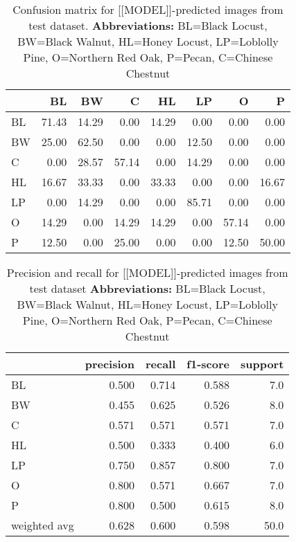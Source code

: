 \documentclass[10pt,twocolumn,letterpaper]{article}
\begin{document}
\begin{table}[!htbp]
  \begin{center}
    \small
    \begin{tabular}{lrrrrrrr}
      \toprule
      {} &     BL &     BW &      C &     HL &     LP &      O &      P \\
      \midrule
      BL &  71.43 &  14.29 &   0.00 &  14.29 &   0.00 &   0.00 &   0.00 \\
      BW &  25.00 &  62.50 &   0.00 &   0.00 &  12.50 &   0.00 &   0.00 \\
      C  &   0.00 &  28.57 &  57.14 &   0.00 &  14.29 &   0.00 &   0.00 \\
      HL &  16.67 &  33.33 &   0.00 &  33.33 &   0.00 &   0.00 &  16.67 \\
      LP &   0.00 &  14.29 &   0.00 &   0.00 &  85.71 &   0.00 &   0.00 \\
      O  &  14.29 &   0.00 &  14.29 &  14.29 &   0.00 &  57.14 &   0.00 \\
      P  &  12.50 &   0.00 &  25.00 &   0.00 &   0.00 &  12.50 &  50.00 \\
      \bottomrule
      \end{tabular}
  \end{center}
  \caption{\label{tab:confusion} Confusion matrix for [[MODEL]]-predicted images from test dataset. \textbf{Abbreviations:} BL=Black Locust, BW=Black Walnut, HL=Honey Locust, LP=Loblolly Pine, O=Northern Red Oak, P=Pecan, C=Chinese Chestnut}
  \end{table}


  \begin{table}[!htbp]
    \begin{center}
      \small
      \begin{tabular}{lrrrr}
        \toprule
        {} &  precision &  recall &  f1-score &  support \\
        \midrule
        BL           &      0.500 &   0.714 &     0.588 &      7.0 \\
        BW           &      0.455 &   0.625 &     0.526 &      8.0 \\
        C            &      0.571 &   0.571 &     0.571 &      7.0 \\
        HL           &      0.500 &   0.333 &     0.400 &      6.0 \\
        LP           &      0.750 &   0.857 &     0.800 &      7.0 \\
        O            &      0.800 &   0.571 &     0.667 &      7.0 \\
        P            &      0.800 &   0.500 &     0.615 &      8.0 \\
        weighted avg &      0.628 &   0.600 &     0.598 &     50.0 \\
        \bottomrule
        \end{tabular}
    \end{center}
    \caption{\label{tab:recall} Precision and recall for [[MODEL]]-predicted images from test dataset \textbf{Abbreviations:} BL=Black Locust, BW=Black Walnut, HL=Honey Locust, LP=Loblolly Pine, O=Northern Red Oak, P=Pecan, C=Chinese Chestnut}
    \end{table}
\end{document}
